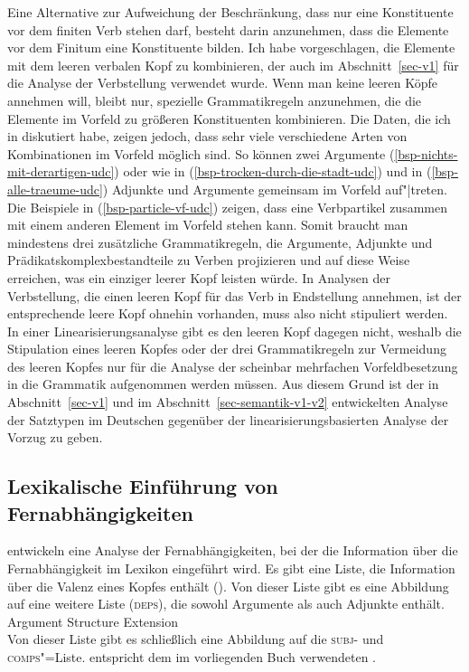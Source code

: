 \noindent
Eine Alternative zur Aufweichung der Beschränkung, dass nur eine Konstituente vor dem finiten
Verb stehen darf, besteht darin anzunehmen, dass die Elemente vor dem Finitum eine Konstituente
bilden. Ich habe vorgeschlagen, die Elemente mit dem leeren verbalen Kopf zu kombinieren, der
auch im Abschnitt~\ref{sec-v1} für die Analyse der Verbstellung verwendet wurde. Wenn man keine
leeren Köpfe annehmen will, bleibt nur, spezielle Grammatikregeln anzunehmen, die die Elemente
im Vorfeld zu größeren Konstituenten kombinieren. Die Daten, die ich in 
diskutiert habe, zeigen jedoch, dass sehr viele verschiedene Arten von Kombinationen
im Vorfeld möglich sind. So können zwei Argumente (\ref{bsp-nichts-mit-derartigen-udc}) oder wie in
(\ref{bsp-trocken-durch-die-stadt-udc}) und in (\ref{bsp-alle-traeume-udc}) Adjunkte und Argumente
gemeinsam im Vorfeld auf"|treten. Die Beispiele in (\ref{bsp-particle-vf-udc}) zeigen, dass eine
Verbpartikel zusammen mit einem anderen Element im Vorfeld stehen kann. Somit braucht man mindestens
drei zusätzliche Grammatikregeln, die Argumente, Adjunkte und Prädikatskomplexbestandteile zu Verben projizieren und auf diese
Weise erreichen, was ein einziger leerer Kopf leisten würde. In Analysen der Verbstellung,
die einen leeren Kopf für das Verb in Endstellung annehmen, ist der entsprechende leere Kopf
ohnehin vorhanden, muss also nicht stipuliert werden. In einer Linearisierungsanalyse gibt es
den leeren Kopf dagegen nicht, weshalb die Stipulation eines leeren Kopfes oder der drei Grammatikregeln
zur Vermeidung des leeren Kopfes nur für die Analyse der scheinbar mehrfachen Vorfeldbesetzung
in die Grammatik aufgenommen werden müssen. Aus diesem Grund ist der in Abschnitt~\ref{sec-v1}
und im Abschnitt~\ref{sec-semantik-v1-v2} entwickelten Analyse der Satztypen im Deutschen
gegenüber der linearisierungsbasierten Analyse der Vorzug zu geben.%


\subsection{Lexikalische Einführung von Fernabhängigkeiten}
\label{sec-lex-intro-udc}\label{Abschnitt-Argumentrealisierungsprinzip-BMS}

\mbox{}\citet*{BMS2001a} entwickeln eine Analyse der Fernabhängigkeiten, bei der
die Information über die Fernabhängigkeit im Lexikon eingeführt wird. Es gibt
eine Liste, die Information über die Valenz eines Kopfes enthält (\argst).
Von dieser Liste gibt es eine Abbildung auf eine weitere Liste (\textsc{deps}),
die sowohl Argumente als auch Adjunkte enthält. 
\ea
Argument Structure Extension \citep*[]{BMS2001a}\\[2pt]
 \impl {}
\z
Von dieser Liste gibt es schließlich eine Abbildung auf die \textsc{subj}- und
\textsc{comps}"=Liste. \subj entspricht dem im vorliegenden Buch verwendeten \sprm.

